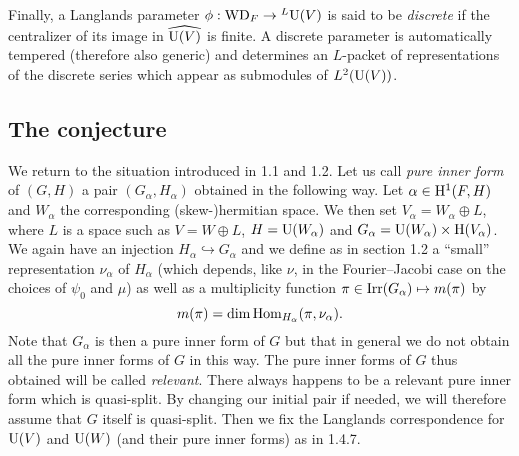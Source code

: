 Finally, a Langlands parameter $\phi: \mathrm{WD}_F \to {}^L \mathrm{U}(V)$ is said to be \emph{discrete} if the centralizer of its image in $\widehat{\mathrm{U}(V)}$ is finite.
A discrete parameter is automatically tempered (therefore also generic) and determines an $L$-packet of representations of the discrete series which appear as submodules of $L^2(\mathrm{U}(V))$.



\subsection{The conjecture}



We return to the situation introduced in 1.1 and 1.2.
Let us call \emph{pure inner form} of $(G, H)$ a pair $(G_\alpha,H_\alpha)$ obtained in the following way.
Let $\alpha \in \mathrm{H}^1(F, H)$ and $W_\alpha$ the corresponding (skew-)hermitian space.
We then set $V_\alpha = W_\alpha \oplus L$, where $L$ is a space such as $V = W \oplus L$, $H = \mathrm{U}(W_\alpha)$ and $G_\alpha = \mathrm{U}(W_\alpha) \times \mathrm{H}(V_\alpha)$.
We again have an injection $H_\alpha \hookrightarrow G_\alpha$ and we define as in section 1.2 a “small” representation $\nu_\alpha$ of $H_\alpha$ (which depends, like $\nu$, in the Fourier--Jacobi case on the choices of $\psi_0$ and $\mu$) as well as a multiplicity function $\pi\in \mathrm{Irr}(G_\alpha) \mapsto m(\pi)$ by
\[
    m(\pi) = \dim \mathrm{Hom}_{H_\alpha} (\pi, \nu_\alpha).
\]
Note that $G_\alpha$ is then a pure inner form of $G$ but that in general we do not obtain all the pure inner forms of $G$ in this way.
The pure inner forms of $G$ thus obtained will be called \emph{relevant}.
There always happens to be a relevant pure inner form which is quasi-split.
By changing our initial pair if needed, we will therefore assume that $G$ itself is quasi-split.
Then we fix the Langlands correspondence for $\mathrm{U}(V)$ and $\mathrm{U}(W)$ (and their pure inner forms) as in 1.4.7.

